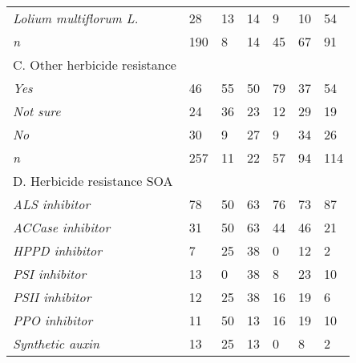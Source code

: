 \documentclass[
  12pt,
  a4paper]{article}
\begin{document}
\begin{table}[ht!]
\begin{tabular}{@{}lllllll@{}}
\hspace{3mm}\textit{Lolium multiflorum L.}                   & 28     & 13    & 14        & 9       & 10        & 54    \\
\hspace{3mm}\textit{n}                             & 190    & 8     & 14        & 45      & 67        & 91    \\
C. Other herbicide resistance &        &       &           &         &           &       \\
\hspace{3mm}\textit{Yes}                           & 46     & 55    & 50        & 79      & 37        & 54    \\
\hspace{3mm}\textit{Not sure}                               & 24     & 36    & 23        & 12      & 29        & 19    \\
\hspace{3mm}\textit{No}                            & 30     & 9     & 27        & 9       & 34        & 26    \\
\hspace{3mm}\textit{n}                             & 257    & 11    & 22        & 57      & 94        & 114   \\
D. Herbicide resistance SOA   &        &       &           &         &           &       \\
\hspace{3mm}\textit{ALS inhibitor}                & 78     & 50    & 63        & 76      & 73        & 87    \\
\hspace{3mm}\textit{ACCase inhibitor}              & 31     & 50    & 63        & 44      & 46        & 21    \\
\hspace{3mm}\textit{HPPD inhibitor}                & 7      & 25    & 38        & 0       & 12        & 2     \\
\hspace{3mm}\textit{PSI inhibitor}                 & 13     & 0     & 38        & 8       & 23        & 10    \\
\hspace{3mm}\textit{PSII inhibitor}                & 12     & 25    & 38        & 16      & 19        & 6     \\
\hspace{3mm}\textit{PPO inhibitor}                 & 11     & 50    & 13        & 16      & 19        & 10    \\
\hspace{3mm}\textit{Synthetic auxin}               & 13     & 25    & 13        & 0       & 8         & 2     \\

\end{tabular}
\end{table}
\end{document}
